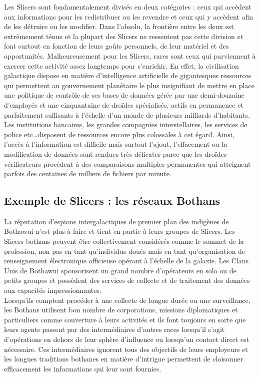 \documentclass[twoside]{article}
\begin{document}
Les Slicers sont fondamentalement divisés en deux catégories : ceux qui accèdent aux informations pour les redistribuer ou les revendre et ceux qui y accèdent afin de les détruire ou les modifier. Dans l'absolu, la frontière entre les deux est extrêmement ténue et la plupart des Slicers ne ressentent pas cette division et font surtout en fonction de leurs goûts personnels, de leur matériel et des opportunités. Malheureusement pour les Slicers, rares sont ceux qui parviennent à exercer cette activité assez longtemps pour s'enrichir. En effet, la civilisation galactique dispose en matière d'intelligence artificielle de gigantesques ressources qui permettent au gouvernement planétaire le plus insignifiant de mettre en place une politique de contrôle de ses bases de données gérée par une demi-douzaine d'employés et une cinquantaine de droïdes spécialisés, actifs en permanence et parfaitement suffisants à l'échelle d'un monde de plusieurs milliards d'habitants. Les institutions bancaires, les grandes compagnies interstellaires, les services de police etc\ldots disposent de ressources encore plus colossales à cet égard. Ainsi, l'accès à l'information est difficile mais surtout l'ajout, l'effacement ou la modification de données sont rendues très délicates parce que les droïdes vérificateurs procèdent à des comparaisons multiples permanentes qui atteignent parfois des centaines de milliers de fichiers par minute.

\subsection{Exemple de Slicers : les réseaux Bothans}
La réputation d'espions intergalactiques de premier plan des indigènes de Bothawui n'est plus à faire et tient en partie à leurs groupes de Slicers. Les Slicers bothans peuvent être collectivement considérés comme le sommet de la profession, non pas en tant qu'individus doués mais en tant qu'organisation de renseignement électronique officieuse opérant à l'échelle de la galaxie. Les Clans Unis de Bothawui sponsorisent un grand nombre d'opérateurs en solo ou de petits groupes et possèdent des services de collecte et de traitement des données aux capacités impressionnantes.\\

Lorsqu'ils comptent procéder à une collecte de longue durée ou une surveillance, les Bothans utilisent bon nombre de corporations, missions diplomatiques et particuliers comme couverture à leurs activités et ils font toujours en sorte que leurs agents passent par des intermédiaires d'autres races lorsqu'il s'agit d'opérations en dehors de leur sphère d'influence ou lorsqu’un contact direct est nécessaire. Ces intermédiaires ignorent tous des objectifs de leurs employeurs et les longues traditions bothanes en matière d'intrigue permettent de cloisonner efficacement les informations qui leur sont fournies.\\
\end{document}
